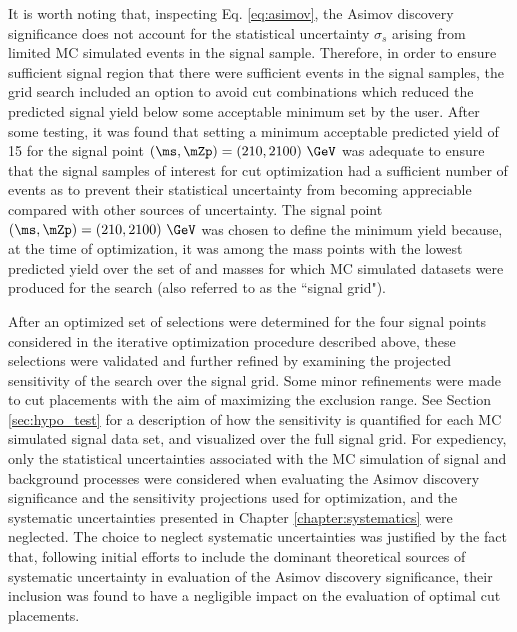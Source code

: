 It is worth noting that, inspecting Eq. \ref{eq:asimov}, the Asimov discovery significance does not account for the statistical uncertainty \(\sigma_s\) arising from limited MC simulated events in the signal sample. Therefore, in order to ensure sufficient signal region that there were sufficient events in the signal samples, the grid search included an option to avoid cut combinations which reduced the predicted signal yield below some acceptable minimum set by the user. After some testing, it was found that setting a minimum acceptable predicted yield of 15 for the signal point \((\ms, \mZp)=(210, 2100)~\GeV\) was adequate to ensure that the signal samples of interest for cut optimization had a sufficient number of events as to prevent their statistical uncertainty from becoming appreciable compared with other sources of uncertainty. The signal point \((\ms, \mZp)=(210, 2100)~\GeV\) was chosen to define the minimum yield because, at the time of optimization, it was among the mass points with the lowest predicted yield over the set of \mZp and \ms masses for which MC simulated datasets were produced for the search (also referred to as the ``signal grid").

After an optimized set of selections were determined for the four signal points considered in the iterative optimization procedure described above, these selections were validated and further refined by examining the projected sensitivity of the search over the signal grid. Some minor refinements were made to cut placements with the aim of maximizing the exclusion range. See Section \ref{sec:hypo_test} for a description of how the sensitivity is quantified for each MC simulated signal data set, and visualized over the full signal grid. For expediency, only the statistical uncertainties associated with the MC simulation of signal and background processes were considered when evaluating the Asimov discovery significance and the sensitivity projections used for optimization, and the systematic uncertainties presented in Chapter \ref{chapter:systematics} were neglected. The choice to neglect systematic uncertainties was justified by the fact that, following initial efforts to include the dominant theoretical sources of systematic uncertainty in evaluation of the Asimov discovery significance, their inclusion was found to have a negligible impact on the evaluation of optimal cut placements.

